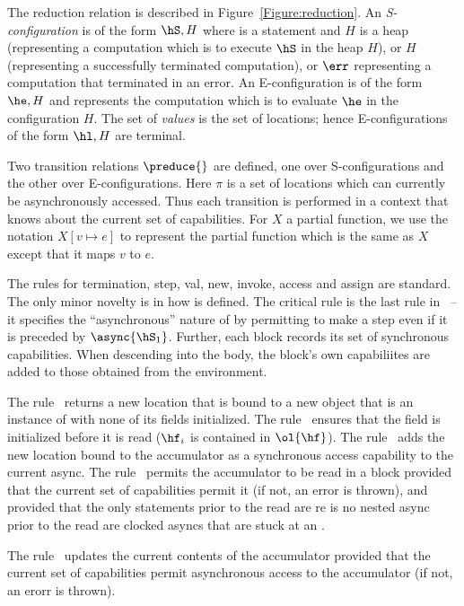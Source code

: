 The reduction relation is described in
Figure~\ref{Figure:reduction}. An {\em S-configuration} is of the form
$\hS,H$ where \hS{} is a statement and $H$ is a heap (representing a
computation which is to execute $\hS$ in the heap $H$), or $H$
(representing a successfully terminated computation), or $\err$
representing a computation that terminated in an error. An
E-configuration is of the form $\he,H$ and represents the
computation which is to evaluate $\he$ in the configuration $H$. The
set of {\em values} is the set of locations; hence E-configurations of
the form $\hl,H$ are terminal.

Two transition relations $\preduce{}$ are defined, one over
S-configurations and the other over E-configurations. Here $\pi$ is a
set of locations which can currently be asynchronously accessed.  Thus
each transition is performed in a context that knows about the current
set of capabilities.  For $X$ a partial function, we use the notation
$X[v \mapsto e]$ to represent the partial function which is the same
as $X$ except that it maps $v$ to $e$.

The rules for termination, step, val, new, invoke, access and assign
are standard.  The only minor novelty is in how \hasync{} is
defined. The critical rule is the last rule in~ -- it
specifies the ``asynchronous'' nature of \hasync{} by permitting \hS{}
to make a step even if it is preceded by $\async{\hS_1}$. Further,
each block records its set of synchronous capabilities. When
descending into the body, the block's own capabiliites are added to
those obtained from the environment.

%
The rule~ returns a new location that is bound to a new
object that is an instance of \hC{} with none of its fields initialized.
%
The rule~ ensures that the field is initialized before it is
read ($\hf_i$ is contained in $\ol{\hf}$).
%
The rule~ adds the new location bound to the
accumulator as a synchronous access capability to the current async.
%
The rule~ permits the accumulator to be read in a
block provided that the current set of capabilities permit it (if not,
an error is thrown), and provided that the only statements prior to
the read are re is no nested async prior to the read are clocked
asyncs that are stuck at an \hadvance.

The rule~ updates the current contents of the
accumulator provided that the current set of capabilities permit
asynchronous access to the accumulator (if not, an erorr is thrown).

